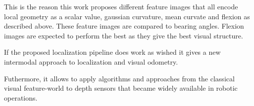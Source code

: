 \documentclass[doktyp=marbeit,fontsize=12pt,sprache=english,draft=true,hausschrift=true]{TUBAFarbeiten}
\begin{document}
This is the reason this work proposes different feature images that all
encode local geometry as a scalar value, gaussian curvature, mean
curvate and flexion as described above. These feature images are
compared to bearing angles. Flexion images are expected to perform the best
as they give the best visual structure.

If the proposed localization pipeline does work as wished it gives a new
intermodal approach to localization and visual odometry.

Futhermore, it allows to apply algorithms and approaches from the
classical visual feature-world to depth sensors that became widely
available in robotic operations.

% 
%
% 
% 
% 
% 
% 
% 
% 

\begin{appendix}
    \newpage

    
    

    \newpage
    \listoftables

    \newpage
    \listoffigures

\end{appendix}
\end{document}
